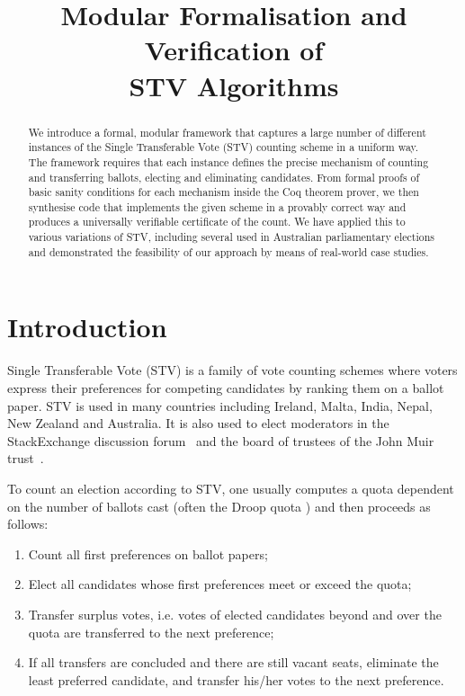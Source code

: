 \documentclass{llncs}
\title{Modular Formalisation and Verification of \\STV Algorithms}
\author{} %
\begin{document}
\maketitle
\pagestyle{plain}
\thispagestyle{empty}
\begin{abstract}
We introduce a formal, modular framework that captures a large number of
different instances of the Single Transferable Vote (STV) counting
scheme in a uniform way. The framework requires that each instance
defines the precise mechanism of counting and transferring ballots,
electing and eliminating candidates. From formal proofs of basic
sanity conditions for each mechanism inside the Coq theorem prover, we then synthesise
code that implements the given scheme in a provably correct way and
produces a universally verifiable certificate of the count. We have
applied this to various variations of STV, including several  used in Australian
parliamentary elections and demonstrated the feasibility of our
approach by means of real-world case studies.
\end{abstract}

\section{Introduction}
 Single Transferable Vote (STV) is a family of 
 vote counting schemes where voters express their 
 preferences for competing candidates by ranking them on a ballot
 paper. STV is used
in many 
 countries including Ireland, Malta, India, Nepal, New Zealand and
 Australia. It is also used to elect moderators in the
 StackExchange discussion forum~\cite{StackExchange:2018:ME} and the
 board of trustees of the John Muir trust~\cite{Trust:2018:AT}. 

 To count an election according to STV, one usually computes a quota
 dependent on the number of ballots cast (often the Droop quota
 \cite{Droop:1881:MER}) and then proceeds as follows:
 \begin{enumerate}
 \item Count all first preferences on ballot papers;
 \item Elect all candidates whose first preferences meet or exceed the
 quota;
 \item Transfer surplus votes, i.e. votes of elected candidates beyond and
 over the quota are transferred to the next preference;
 \item If all transfers are concluded and there are still vacant
 seats, eliminate the least preferred candidate, and transfer his/her  votes
 to the next preference.
 \end{enumerate}
\end{document}
